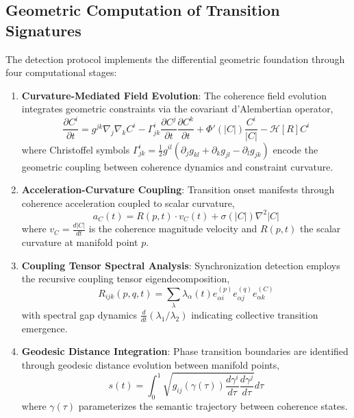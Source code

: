 \subsection{Geometric Computation of Transition Signatures}

The detection protocol implements the differential geometric foundation through four computational stages:

\begin{enumerate}
    \item \textbf{Curvature-Mediated Field Evolution}: The coherence field evolution integrates geometric constraints via the covariant d'Alembertian operator,
    \begin{equation}
    \frac{\partial C^i}{\partial t} = g^{jk} \nabla_j \nabla_k C^i - \Gamma^i_{jk} \frac{\partial C^j}{\partial t} \frac{\partial C^k}{\partial t} + \Phi'(|C|) \frac{C^i}{|C|} - \mathcal{H}[R] C^i
    \end{equation}
    where Christoffel symbols $\Gamma^i_{jk} = \frac{1}{2} g^{il}(\partial_j g_{kl} + \partial_k g_{jl} - \partial_l g_{jk})$ encode the geometric coupling between coherence dynamics and constraint curvature.

    \item \textbf{Acceleration-Curvature Coupling}: Transition onset manifests through coherence acceleration coupled to scalar curvature,
    \begin{equation}
    a_C(t) = R(p,t) \cdot v_C(t) + \sigma(|C|) \nabla^2 |C|
    \end{equation}
    where $v_C = \frac{d|C|}{dt}$ is the coherence magnitude velocity and $R(p,t)$ the scalar curvature at manifold point $p$.

    \item \textbf{Coupling Tensor Spectral Analysis}: Synchronization detection employs the recursive coupling tensor eigendecomposition,
    \begin{equation}
    R_{ijk}(p,q,t) = \sum_\lambda \lambda_\alpha(t) e^{(p)}_{\alpha i} e^{(q)}_{\alpha j} e^{(C)}_{\alpha k}
    \end{equation}
    with spectral gap dynamics $\frac{d}{dt}(\lambda_1/\lambda_2)$ indicating collective transition emergence.

    \item \textbf{Geodesic Distance Integration}: Phase transition boundaries are identified through geodesic distance evolution between manifold points,
    \begin{equation}
    s(t) = \int_0^1 \sqrt{g_{ij}(\gamma(\tau)) \frac{d\gamma^i}{d\tau} \frac{d\gamma^j}{d\tau}} d\tau
    \end{equation}
    where $\gamma(\tau)$ parameterizes the semantic trajectory between coherence states.
\end{enumerate}

